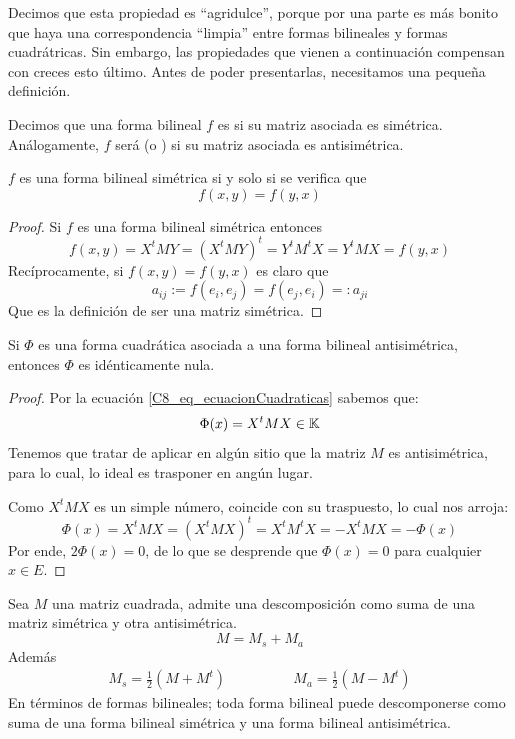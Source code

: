 Decimos que esta propiedad es ``agridulce'', porque por una parte es más bonito que haya una correspondencia ``limpia'' entre formas bilineales y formas cuadrátricas. Sin embargo, las propiedades que vienen a continuación compensan con creces esto último. Antes de poder presentarlas, necesitamos una pequeña definición.
\begin{defi}
	Decimos que una forma bilineal $f$ es  si su matriz asociada es simétrica. Análogamente, $f$ será  (o ) si su matriz asociada es antisimétrica.
\end{defi}
\begin{lem}
	$f$ es una forma bilineal simétrica si y solo si se verifica que \[f(x,y)=f(y,x)\]
\end{lem}
\begin{proof}
	Si $f$ es una forma bilineal simétrica entonces \[f(x,y)=X^tMY=(X^tMY)^t=Y^tM^tX=Y^tMX=f(y,x)\]
	Recíprocamente, si $f(x,y)=f(y,x)$ es claro que \[a_{ij}:=f(e_i,e_j)=f(e_j,e_i)=:a_{ji}\]
	Que es la definición de ser una matriz simétrica.
\end{proof}
\begin{lem}
	\label{C8_lem_antisimetricaNula}
	Si $\Phi$ es una forma cuadrática asociada a una forma bilineal antisimétrica, entonces $\Phi$ es idénticamente nula.
\end{lem}
\begin{proof}
	Por la ecuación \eqref{C8_eq_ecuacionCuadraticas} sabemos que:
	\[\Phi(x)=X^tMX\in\mathbb{K}\]
	Tenemos que tratar de aplicar en algún sitio que la matriz $M$ es antisimétrica, para lo cual, lo ideal es trasponer en angún lugar.
	
	Como $X^tMX$ es un simple número, coincide con su traspuesto, lo cual nos arroja:
	\[\Phi(x)=X^tMX=(X^tMX)^t=X^tM^tX=-X^tMX=-\Phi(x)\]
	Por ende, $2\Phi(x)=0$, de lo que se desprende que $\Phi(x)=0$ para cualquier $x\in E$.
\end{proof}
\begin{lem}
	\label{C8_lem_descomposicion}
	Sea $M$ una matriz cuadrada, admite una descomposición como suma de una matriz simétrica y otra antisimétrica.
	\[M= M_s+M_a\]
	Además
	\[\begin{array}{cc}
	M_s=\frac{1}{2}(M+M^t)\qquad &\qquad M_a=\frac{1}{2}(M-M^t)
	\end{array}\]
	En términos de formas bilineales; toda forma bilineal puede descomponerse como suma de una forma bilineal simétrica y una forma bilineal antisimétrica.
\end{lem}

